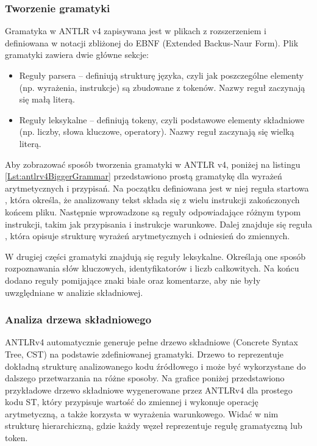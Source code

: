 \documentclass[12pt,twoside]{article}
\begin{document}
\subsubsection{Tworzenie gramatyki}
Gramatyka w ANTLR v4 zapisywana jest w plikach z rozszerzeniem  i definiowana w notacji zbliżonej do EBNF (Extended Backus-Naur Form). Plik gramatyki zawiera dwie główne sekcje:
\begin{itemize}[label=\textbullet, leftmargin=1.25cm]
   \item Reguły parsera -- definiują strukturę języka, czyli jak poszczególne elementy (np. wyrażenia, instrukcje) są zbudowane z tokenów. Nazwy reguł zaczynają się małą literą.
   \item Reguły leksykalne -- definiują tokeny, czyli podstawowe elementy składniowe (np. liczby, słowa kluczowe, operatory). Nazwy reguł zaczynają się wielką literą.
\end{itemize}
Aby zobrazować sposób tworzenia gramatyki w ANTLR v4, poniżej na listingu  \ref{Lst:antlrv4BiggerGrammar}  przedstawiono prostą gramatykę dla wyrażeń arytmetycznych i przypisań. Na początku definiowana jest w niej reguła startowa , która określa, że analizowany tekst składa się z wielu instrukcji zakończonych końcem pliku. Następnie wprowadzone są reguły odpowiadające różnym typom instrukcji, takim jak przypisania i instrukcje warunkowe. Dalej znajduje się reguła , która opisuje strukturę wyrażeń arytmetycznych i odniesień do zmiennych.

W drugiej części gramatyki znajdują się reguły leksykalne. Określają one sposób rozpoznawania słów kluczowych, identyfikatorów i liczb całkowitych. Na końcu dodano reguły pomijające znaki białe oraz komentarze, aby nie były uwzględniane w analizie składniowej.



\subsubsection{Analiza drzewa składniowego}
ANTLRv4 automatycznie generuje pełne drzewo składniowe (Concrete Syntax Tree, CST) na podstawie zdefiniowanej gramatyki. Drzewo to reprezentuje dokładną strukturę analizowanego kodu źródłowego i może być wykorzystane do dalszego przetwarzania na różne sposoby. Na grafice poniżej przedstawiono przykładowe drzewo składniowe wygenerowane przez ANTLRv4 dla prostego kodu ST, który przypisuje wartość do zmiennej i wykonuje operację arytmetyczną, a także korzysta w wyrażenia warunkowego. Widać w nim strukturę hierarchiczną, gdzie każdy węzeł reprezentuje regułę gramatyczną lub token.
\end{document}
